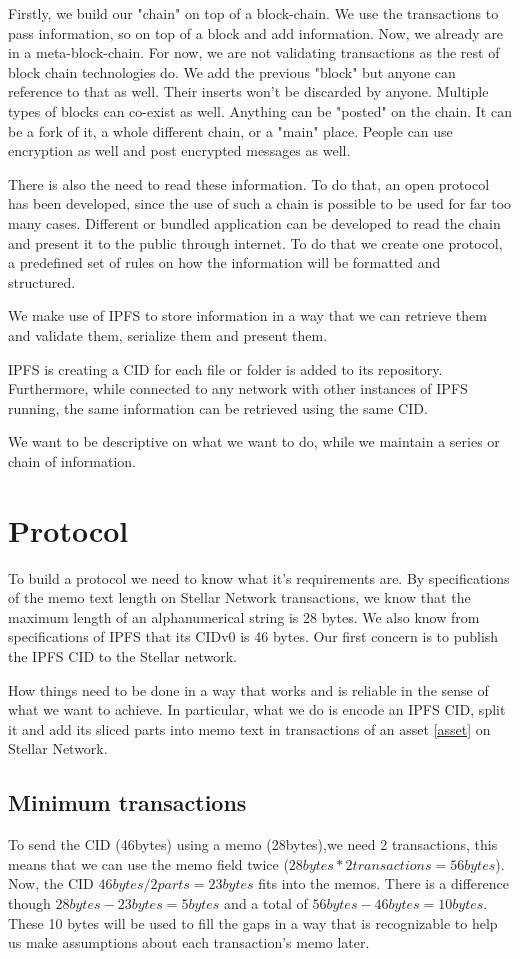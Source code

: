 \documentclass[10pt,a4paper,twocolumn]{paper}
\begin{document}
	Firstly, we build our "chain" on top of a block-chain. We use the transactions to pass information, so on top of a block and add information. Now, we already are in a meta-block-chain. For now, we are not validating transactions as the rest of block chain technologies do. We add the previous "block" but anyone can reference to that as well. Their inserts won't be discarded by anyone. Multiple types of blocks can co-exist as well. Anything can be "posted" on the chain. It can be a fork of it, a whole different chain, or a "main" place. People can use encryption as well and post encrypted messages as well.
	
	There is also the need to read these information. To do that, an open protocol has been developed, since the use of such a chain is possible to be used for far too many cases. Different or bundled application can be developed to read the chain and present it to the public through internet. To do that we create one protocol, a predefined set of rules on how the information will be formatted and structured.
	
	We make use of IPFS to store information in a way that we can retrieve them and validate them, serialize them and present them.
	
	IPFS is creating a CID for each file or folder is added to its repository. Furthermore, while connected to any network with other instances of IPFS running, the same information can be retrieved using the same CID.
	
	We want to be descriptive on what we want to do, while we maintain a series or chain of information.

	\section{Protocol}\label{protocol}
	To build a protocol we need to know what it's requirements are. By specifications of the memo text length on Stellar Network transactions, we know that the maximum length of an alphanumerical string is 28 bytes. We also know from specifications of IPFS that its CIDv0 is 46 bytes. Our first concern is to publish the IPFS CID to the Stellar network.
	
	How things need to be done in a way that works and is reliable in the sense of what we want to achieve. In particular, what we do is encode an IPFS CID, split it and add its sliced parts into memo text in transactions of an asset \ref{asset} on Stellar Network.
	

	\subsection{Minimum transactions}\label{minimum_transactions}
	To send the CID (46bytes) using a memo (28bytes),we need 2 transactions, this means that we can use the memo field twice ($ 28bytes*2transactions=56bytes $). Now, the CID $ 46bytes/2parts=23bytes $ fits into the memos. There is a difference though $ 28bytes-23bytes=5bytes $ and a total of $56bytes-46bytes=10bytes$. These 10 bytes will be used to fill the gaps in a way that is recognizable to help us make assumptions about each transaction's memo later.
	
\end{document}
